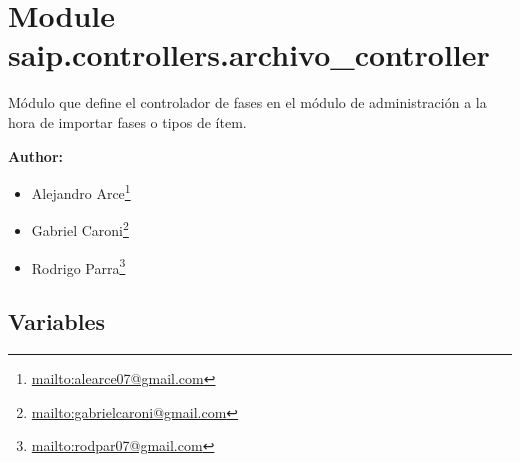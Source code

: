 %
%
%


\section{Module saip.controllers.archivo\_controller}

    \label{saip:controllers:archivo_controller}
Módulo que define el controlador de fases en el módulo de administración a 
la hora de importar fases o tipos de ítem.

\textbf{Author:} \begin{itemize}
\setlength{\parskip}{0.6ex}
  \item Alejandro 
    Arce\footnote{\href{mailto:alearce07@gmail.com}{mailto:alearce07@gmail.com}}

  \item Gabriel 
    Caroni\footnote{\href{mailto:gabrielcaroni@gmail.com}{mailto:gabrielcaroni@gmail.com}}

  \item Rodrigo 
    Parra\footnote{\href{mailto:rodpar07@gmail.com}{mailto:rodpar07@gmail.com}}

\end{itemize}





  \subsection{Variables}

